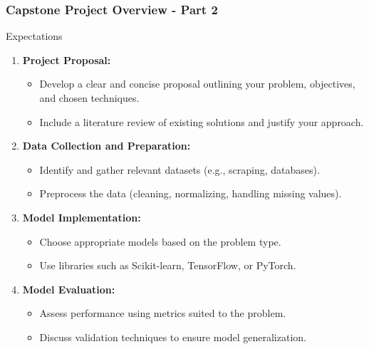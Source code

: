 \documentclass[aspectratio=169]{beamer}
\begin{document}
\begin{frame}[fragile]
    \frametitle{Capstone Project Overview - Part 2}
    \begin{block}{Expectations}
        \begin{enumerate}
            \item \textbf{Project Proposal:}
            \begin{itemize}
                \item Develop a clear and concise proposal outlining your problem, objectives, and chosen techniques.
                \item Include a literature review of existing solutions and justify your approach.
            \end{itemize}

            \item \textbf{Data Collection and Preparation:}
            \begin{itemize}
                \item Identify and gather relevant datasets (e.g., scraping, databases).
                \item Preprocess the data (cleaning, normalizing, handling missing values).
            \end{itemize}

            \item \textbf{Model Implementation:}
            \begin{itemize}
                \item Choose appropriate models based on the problem type.
                \item Use libraries such as Scikit-learn, TensorFlow, or PyTorch.
            \end{itemize}

            \item \textbf{Model Evaluation:}
            \begin{itemize}
                \item Assess performance using metrics suited to the problem.
                \item Discuss validation techniques to ensure model generalization.
            \end{itemize}
        \end{enumerate}
    \end{block}
\end{frame}
\end{document}
